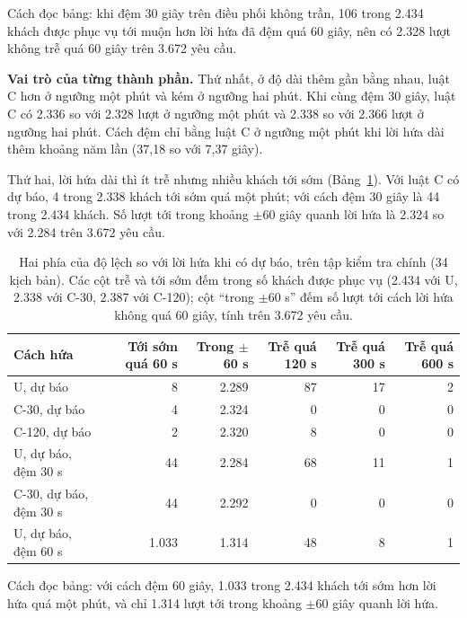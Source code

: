 Cách đọc bảng: khi đệm 30 giây trên điều phối không trần, 106 trong 2.434 khách được phục vụ tới muộn hơn lời hứa
đã đệm quá 60 giây, nên có 2.328 lượt không trễ quá 60 giây trên 3.672 yêu cầu.

\textbf{Vai trò của từng thành phần.} Thứ nhất, ở độ dài thêm gần bằng nhau, luật C hơn ở ngưỡng một phút và kém ở
ngưỡng hai phút. Khi cùng đệm 30 giây, luật C có 2.336 so với 2.328 lượt ở ngưỡng một phút và 2.338 so với 2.366
lượt ở ngưỡng hai phút. Cách đệm chỉ bằng luật C ở ngưỡng một phút khi lời hứa dài thêm khoảng năm lần (37,18 so với
7,37 giây).

Thứ hai, lời hứa dài thì ít trễ nhưng nhiều khách tới sớm (Bảng~\ref{bang:c4-haiphia}). Với luật C có dự báo, 4 trong
2.338 khách tới sớm quá một phút; với cách đệm 30 giây là 44 trong 2.434 khách. Số lượt tới trong khoảng $\pm$60 giây
quanh lời hứa là 2.324 so với 2.284 trên 3.672 yêu cầu.

\begin{table}[htbp]
\centering
\caption{Hai phía của độ lệch so với lời hứa khi có dự báo, trên tập kiểm tra chính (34 kịch bản). Các cột trễ và
tới sớm đếm trong số khách được phục vụ (2.434 với U, 2.338 với C-30, 2.387 với C-120); cột ``trong $\pm$60 s''
đếm số lượt tới cách lời hứa không quá 60 giây, tính trên 3.672 yêu cầu.}
\label{bang:c4-haiphia}
\small
\begin{tabular}{@{}p{4.4cm}rrrrr@{}}
\toprule
\textbf{Cách hứa} & \textbf{Tới sớm quá 60 s} & \textbf{Trong $\pm$60 s} & \textbf{Trễ quá 120 s} &
\textbf{Trễ quá 300 s} & \textbf{Trễ quá 600 s}\\
\midrule
U, dự báo & 8 & 2.289 & 87 & 17 & 2\\
C-30, dự báo & 4 & 2.324 & 0 & 0 & 0\\
C-120, dự báo & 2 & 2.320 & 8 & 0 & 0\\
U, dự báo, đệm 30 s & 44 & 2.284 & 68 & 11 & 1\\
C-30, dự báo, đệm 30 s & 44 & 2.292 & 0 & 0 & 0\\
U, dự báo, đệm 60 s & 1.033 & 1.314 & 48 & 8 & 1\\
\bottomrule
\end{tabular}
\end{table}

Cách đọc bảng: với cách đệm 60 giây, 1.033 trong 2.434 khách tới sớm hơn lời hứa quá một phút, và chỉ 1.314 lượt tới
trong khoảng $\pm$60 giây quanh lời hứa.

